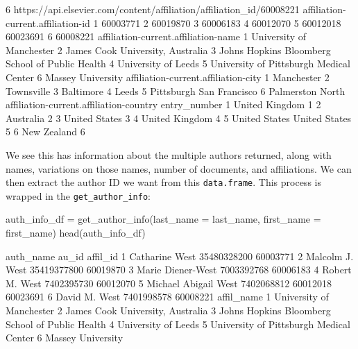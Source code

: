 \begin{Schunk}
\begin{Soutput}
6          https://api.elsevier.com/content/affiliation/affiliation_id/60008221
  affiliation-current.affiliation-id
1                           60003771
2                           60019870
3                           60006183
4                           60012070
5                  60012018 60023691
6                           60008221
             affiliation-current.affiliation-name
1                        University of Manchester
2                James Cook University, Australia
3 Johns Hopkins Bloomberg School of Public Health
4                             University of Leeds
5         University of Pittsburgh Medical Center
6                               Massey University
  affiliation-current.affiliation-city
1                           Manchester
2                           Townsville
3                            Baltimore
4                                Leeds
5             Pittsburgh San Francisco
6                     Palmerston North
  affiliation-current.affiliation-country entry_number
1                          United Kingdom            1
2                               Australia            2
3                           United States            3
4                          United Kingdom            4
5             United States United States            5
6                             New Zealand            6
\end{Soutput}
\end{Schunk}

We see this has information about the multiple authors returned, along
with names, variations on those names, number of documents, and
affiliations. We can then extract the author ID we want from this
\texttt{data.frame}. This process is wrapped in the
\texttt{get\_author\_info}:

\begin{Schunk}
\begin{Sinput}
auth_info_df = get_author_info(last_name = last_name, 
                              first_name = first_name)
head(auth_info_df)
\end{Sinput}
\begin{Soutput}
             auth_name       au_id          affil_id
1       Catharine West 35480328200          60003771
2      Malcolm J. West 35419377800          60019870
3    Marie Diener-West  7003392768          60006183
4       Robert M. West  7402395730          60012070
5 Michael Abigail West  7402068812 60012018 60023691
6        David M. West  7401998578          60008221
                                       affil_name
1                        University of Manchester
2                James Cook University, Australia
3 Johns Hopkins Bloomberg School of Public Health
4                             University of Leeds
5         University of Pittsburgh Medical Center
6                               Massey University
\end{Soutput}
\end{Schunk}

